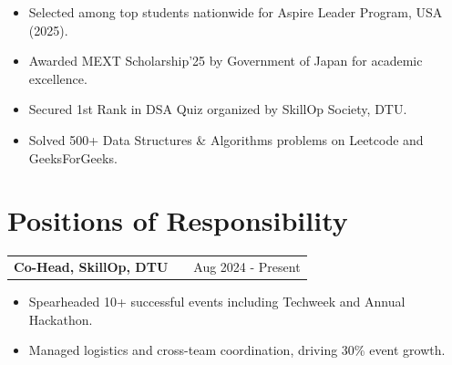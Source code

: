 \documentclass[a4paper,10pt]{article}
\makeatletter
\newenvironment{joblong}[2]
    {
    \begin{tabularx}{\linewidth}{@{}l X r@{}}
    \textbf{#1} & \hfill &  #2 \\[3.75pt]
    \end{tabularx}
    \begin{minipage}[t]{\linewidth}
    \begin{itemize}[nosep,after=\strut, leftmargin=1em, itemsep=3pt,label=--]
    }
    {
    \end{itemize}
    \end{minipage}    
    }
\makeatother
\begin{document}
\begin{itemize}[nosep,leftmargin=1.2em]
\item Selected among top students nationwide for Aspire Leader Program, USA (2025).
\item Awarded MEXT Scholarship’25 by Government of Japan for academic excellence.
\item Secured 1st Rank in DSA Quiz organized by SkillOp Society, DTU.
\item Solved 500+ Data Structures \& Algorithms problems on Leetcode and GeeksForGeeks.
\end{itemize}

\section{Positions of Responsibility}


\begin{joblong}{Co-Head, SkillOp, DTU}{Aug 2024 - Present}
\item Spearheaded 10+ successful events including Techweek and Annual Hackathon.
\item Managed logistics and cross-team coordination, driving 30\% event growth.
\end{joblong}
\vspace{3pt}




\vfill
{}
\end{document}
